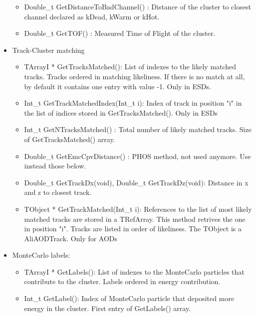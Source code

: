 \begin{itemize}
\begin{itemize}
	\item Double\_t GetDistanceToBadChannel() : Distance of the cluster to closest channel declared as kDead, kWarm or kHot.

	\item Double\_t GetTOF() :  Measured Time of Flight of the cluster.
	\end{itemize}

\item Track-Cluster matching
	\begin{itemize}

	\item TArrayI * GetTracksMatched(): List of indexes to the likely matched tracks. Tracks ordered in matching likeliness. If there is no match at all, by default it contains one entry with value -1. Only in ESDs.

	\item Int\_t GetTrackMatchedIndex(Int\_t i): Index of track in position "i" in the list of indices stored in GetTracksMatched(). Only in ESDs

	\item Int\_t GetNTracksMatched() : Total number of likely matched tracks. Size of GetTracksMatched() array.

	\item Double\_t GetEmcCpvDistance() : PHOS method, not used anymore. Use instead those below.

	\item Double\_t GetTrackDx(void), Double\_t GetTrackDz(void): Distance in x and z to closest track. 

	\item TObject * GetTrackMatched(Int\_t i): References to the list of most likely matched tracks are stored in a TRefArray. This method retrives the one in position "i". Tracks are listed in order of likeliness. The TObject is a AliAODTrack. Only for AODs

	\end{itemize}

\item MonteCarlo labels:
	\begin{itemize}

	\item TArrayI * GetLabels(): List of indexes to the MonteCarlo particles that contribute to the cluster. Labels ordered in energy contribution.

	\item Int\_t GetLabel(): Index of MonteCarlo particle that deposited more energy in the cluster. First entry of GetLabels() array.
	

\end{itemize}
\end{itemize}
